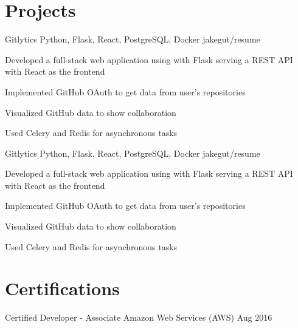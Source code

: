 \documentclass[letterpaper]{resume_config}
\begin{document}
\vspace{-10pt}

\section{Projects}

\Project
    {Gitlytics} %
    {Python, Flask, React, PostgreSQL, Docker} %
    {jakegut/resume} %
    {
        \item Developed a full-stack web application using with Flask serving a REST API with React as the frontend
        \item Implemented GitHub OAuth to get data from user’s repositories
        \item Visualized GitHub data to show collaboration
        \item Used Celery and Redis for asynchronous tasks
    }

\Project
    {Gitlytics} %
    {Python, Flask, React, PostgreSQL, Docker} %
    {jakegut/resume} %
    {
        \item Developed a full-stack web application using with Flask serving a REST API with React as the frontend
        \item Implemented GitHub OAuth to get data from user’s repositories
        \item Visualized GitHub data to show collaboration
        \item Used Celery and Redis for asynchronous tasks
    }

\vspace{-8pt}

\section{Certifications}

\Certification
    {Certified Developer - Associate} %
    {Amazon Web Services (AWS)} %
    {Aug 2016} %

\vspace{-7pt}
\end{document}
